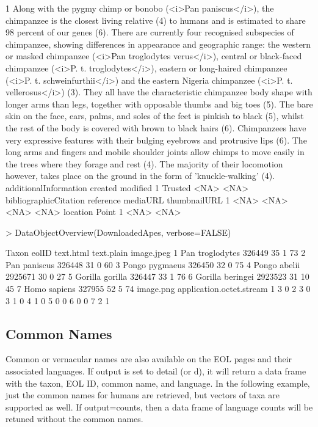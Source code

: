 \documentclass[12pt]{article}
\begin{document}
\begin{Schunk}
\begin{Soutput}
1 Along with the pygmy chimp or bonobo (<i>Pan paniscus</i>), the chimpanzee is the closest living relative (4) to humans and is estimated to share 98 percent of our genes (6). There are currently four recognised subspecies of chimpanzee, showing differences in appearance and geographic range: the western or masked chimpanzee (<i>Pan troglodytes verus</i>), central or black-faced chimpanzee (<i>P. t. troglodytes</i>), eastern or long-haired chimpanzee (<i>P. t. schweinfurthii</i>) and the eastern Nigeria chimpanzee (<i>P. t. vellerosus</i>) (3). They all have the characteristic chimpanzee body shape with longer arms than legs, together with opposable thumbs and big toes (5). The bare skin on the face, ears, palms, and soles of the feet is pinkish to black (5), whilst the rest of the body is covered with brown to black hairs (6). Chimpanzees have very expressive features with their bulging eyebrows and protrusive lips (6). The long arms and fingers and mobile shoulder joints allow chimps to move easily in the trees where they forage and rest (4). The majority of their locomotion however, takes place on the ground in the form of 'knuckle-walking' (4).
  additionalInformation created modified
1               Trusted    <NA>     <NA>
  bibliographicCitation reference mediaURL thumbnailURL
1                  <NA>      <NA>     <NA>         <NA>
  location Point
1     <NA>  <NA>
\end{Soutput}
\begin{Sinput}
> DataObjectOverview(DownloadedApes, verbose=FALSE)
\end{Sinput}
\begin{Soutput}
             Taxon   eolID text.html text.plain image.jpeg
1  Pan troglodytes  326449        35          1         73
2     Pan paniscus  326448        31          0         60
3   Pongo pygmaeus  326450        32          0         75
4     Pongo abelii 2925671        30          0         27
5  Gorilla gorilla  326447        33          1         76
6 Gorilla beringei 2923523        31         10         45
7     Homo sapiens  327955        52          5         74
  image.png application.octet.stream
1         3                        0
2         3                        0
3         1                        0
4         1                        0
5         0                        0
6         0                        0
7         2                        1
\end{Soutput}
\end{Schunk}

\subsection{Common Names}
Common or vernacular names are also available on the EOL pages and their associated languages. If output is set to detail (or d), it will return a data frame with the taxon, EOL ID, common name, and language. In the following example, just the common names for humans are retrieved, but vectors of taxa are supported as well. If output=counts, then a data frame of language counts will be retuned without the common names.
\end{document}
